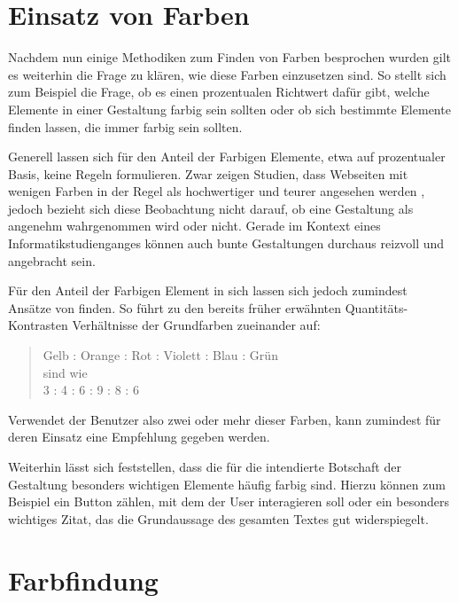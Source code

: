 \section{Einsatz von Farben}\label{einsatz}

Nachdem nun einige Methodiken zum Finden von Farben besprochen wurden gilt es weiterhin die Frage zu klären, wie diese Farben einzusetzen sind. So stellt sich zum Beispiel die Frage, ob es einen prozentualen Richtwert dafür gibt, welche Elemente in einer Gestaltung farbig sein sollten oder ob sich bestimmte Elemente finden lassen, die immer farbig sein sollten.

Generell lassen sich für den Anteil der Farbigen Elemente, etwa auf prozentualer Basis, keine Regeln formulieren. Zwar zeigen Studien, dass Webseiten mit wenigen Farben in der Regel als hochwertiger und teurer angesehen werden \cite{zhang2016makes}, jedoch bezieht sich diese Beobachtung nicht darauf, ob eine Gestaltung als angenehm wahrgenommen wird oder nicht. Gerade im Kontext eines Informatikstudienganges können auch bunte Gestaltungen durchaus reizvoll und angebracht sein.

Für den Anteil der Farbigen Element in sich lassen sich jedoch zumindest Ansätze von finden. So führt \cite[S. 59]{Itten201006} zu den bereits früher erwähnten Quantitäts-Kontrasten Verhältnisse der Grundfarben zueinander auf:

\begin{quote}
Gelb : Orange : Rot : Violett : Blau : Grün \\
sind wie \\
3 : 4 : 6 : 9 : 8 : 6
\end{quote}

Verwendet der Benutzer also zwei oder mehr dieser Farben, kann zumindest für deren Einsatz eine Empfehlung gegeben werden.

Weiterhin lässt sich feststellen, dass die für die intendierte Botschaft der Gestaltung besonders wichtigen Elemente häufig farbig sind. Hierzu können zum Beispiel ein Button zählen, mit dem der User interagieren soll oder ein besonders wichtiges Zitat, das die Grundaussage des gesamten Textes gut widerspiegelt.


\section{Farbfindung}

